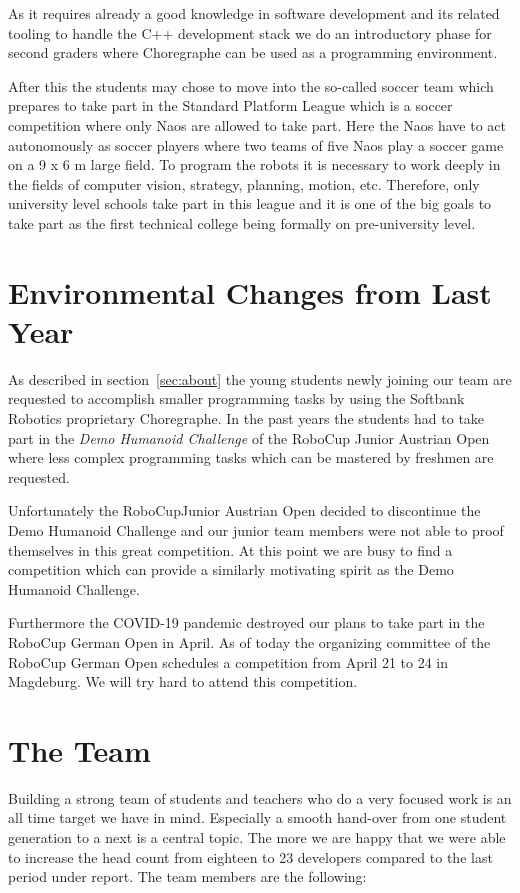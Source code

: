\documentclass[11pt]{article}
\begin{document}
As it requires already a good knowledge in software development and its related tooling to handle the C++ development stack we do an introductory phase for second graders where Choregraphe can be used as a programming environment.

After this the students may chose to move into the so-called soccer team which prepares to take part in the Standard Platform League which is a soccer competition where only Naos are allowed to take part. Here the Naos have to act autonomously as soccer players where two teams of five Naos play a soccer game on a 9 x 6 m large field. To program the robots it is necessary to work deeply in the fields of computer vision, strategy, planning, motion, etc. Therefore, only university level schools take part in this league and it is one of the big goals to take part as the first technical college being formally on pre-university level.

\section{Environmental Changes from Last Year}
As described in section~\ref{sec:about} the young students newly joining our team are requested to accomplish smaller programming tasks by using the Softbank Robotics proprietary Choregraphe. In the past years the students had to take part in the {\em Demo Humanoid Challenge} of the RoboCup Junior Austrian Open where less complex programming tasks which can be mastered by freshmen are requested.

Unfortunately the RoboCupJunior Austrian Open decided to discontinue the Demo Humanoid Challenge and our junior team members were not able to proof themselves in this great competition. At this point we are busy to find a competition which can provide a similarly motivating spirit as the Demo Humanoid Challenge.

Furthermore the COVID-19 pandemic destroyed our plans to take part in the RoboCup German Open in April. As of today the organizing committee of the RoboCup German Open schedules a competition from April 21 to 24 in Magdeburg. We will try hard to attend this competition.

\section{The Team}
Building a strong team of students and teachers who do a very focused work is an all time target we have in mind. Especially a smooth hand-over from one student generation to a next is a central topic. The more we are happy that we were able to increase the head count from eighteen  to 23 developers compared to the last period under report. The team members are the following: 
\end{document}
